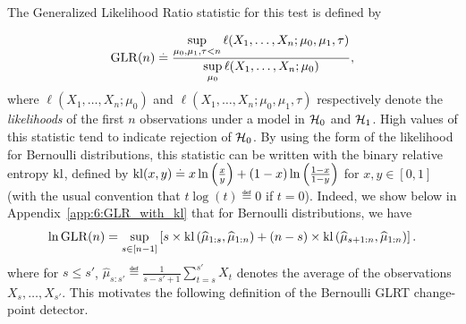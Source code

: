 The Generalized Likelihood Ratio statistic for this test is defined by

\begin{equation}\label{eq:6:firstDefGLRT}
    \mathrm{GLR}(n) \overset{.}{=} \frac{\sup\limits_{\mu_0,\mu_1,\tau < n}\ell(X_1, \dots, X_n ; \mu_0,\mu_1,\tau)}{\sup\limits_{\mu_0}\ell(X_1, \dots, X_n ; \mu_0)},
\end{equation}
%
where $\ell(X_1, \dots, X_n ; \mu_0)$ and $\ell(X_1, \dots, X_n ; \mu_0,\mu_1,\tau)$ respectively denote the \emph{likelihoods} of the first $n$ observations under a model in $\mathcal{H}_0$ and $\mathcal{H}_1$.
High values of this statistic tend to indicate rejection of $\mathcal{H}_0$.
%
By using the form of the likelihood for Bernoulli distributions, this statistic can be written with the binary relative entropy $\mathrm{kl}$,
defined by $\mathrm{kl}(x,y) \overset{.}{=} x \ln\left(\frac{x}{y}\right) + (1-x)\ln\left(\frac{1-x}{1-y}\right)$ for $x,y\in[0,1]$ (with the usual convention that $t \log(t) \eqdef 0$ if $t=0$).
%
Indeed, we show below
in Appendix~\ref{app:6:GLR_with_kl}
that for Bernoulli distributions, we have
\begin{equation}\label{eq:6:secondDefGLRT}
    \ln \mathrm{GLR}(n) = \sup_{s \in [n-1]} \left[s \times \mathrm{kl}\left(\widehat{\mu}_{1:s},\widehat{\mu}_{1:n}\right) + (n-s) \times \mathrm{kl}\left(\widehat{\mu}_{s+1:n},\widehat{\mu}_{1:n}\right)\right].
\end{equation}
%
where for $s \leq s'$, $\widehat{\mu}_{s:s'} \eqdef \frac{1}{s - s' + 1} \sum_{t=s}^{s'} X_t$ denotes the average of the observations $X_s,\dots,X_{s'}$.
%
%
This motivates the following definition of the Bernoulli GLRT change-point detector.

